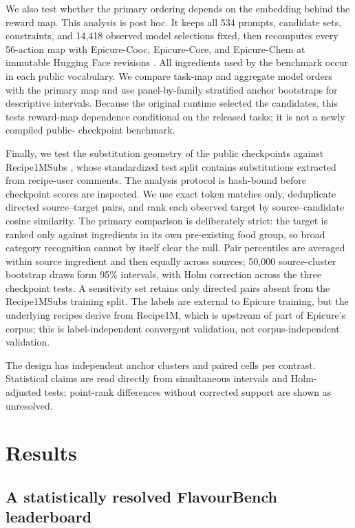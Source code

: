 \documentclass[10pt,twocolumn]{article}
\begin{document}
We also test whether the primary ordering depends on the embedding behind the reward map. This
analysis is post hoc. It keeps all 534 prompts, candidate sets, constraints, and 14,418 observed
model selections fixed, then recomputes every 56-action map with Epicure-Cooc, Epicure-Core, and
Epicure-Chem at immutable Hugging Face revisions \cite{radzikowski2026geometry}. All ingredients
used by the benchmark occur in each public vocabulary. We compare task-map and aggregate model
orders with the primary map and use \FBPublicScorerReplicates{} panel-by-family stratified anchor
bootstraps for descriptive intervals. Because the original runtime selected the candidates, this
tests reward-map dependence conditional on the released tasks; it is not a newly compiled public-
checkpoint benchmark.

Finally, we test the substitution geometry of the public checkpoints against Recipe1MSubs
\cite{fatemi2023substitute}, whose standardized test split contains substitutions extracted from
recipe-user comments. The analysis protocol is hash-bound before checkpoint scores are inspected.
We use exact token matches only, deduplicate directed source--target pairs, and rank each observed
target by source--candidate cosine similarity. The primary comparison is deliberately strict: the
target is ranked only against ingredients in its own pre-existing food group, so broad category
recognition cannot by itself clear the null. Pair percentiles are averaged within source ingredient
and then equally across sources; 50,000 source-cluster bootstrap draws form 95\% intervals, with
Holm correction across the three checkpoint tests. A sensitivity set retains only directed pairs
absent from the Recipe1MSubs training split. The labels are external to Epicure training, but the
underlying recipes derive from Recipe1M, which is upstream of part of Epicure's corpus; this is
label-independent convergent validation, not corpus-independent validation.

The design has \FBIndependentClusters{} independent anchor clusters and \FBTasks{} paired cells
per contrast. Statistical claims are read directly from simultaneous intervals and Holm-adjusted
tests; point-rank differences without corrected support are shown as unresolved.

\section{Results}
\label{sec:results}

\subsection{A statistically resolved FlavourBench leaderboard}
\end{document}

